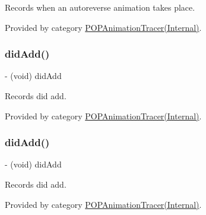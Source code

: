 Records when an autoreverse animation takes place. 

Provided by category \mbox{\hyperlink{category_p_o_p_animation_tracer_07_internal_08_a641c94b868612f3d5b92b24cc4098517}{P\+O\+P\+Animation\+Tracer(\+Internal)}}.

\mbox{\label{interface_p_o_p_animation_tracer_ad853415c050d51eea5ca62c154e9e94a}} 
\subsubsection{\texorpdfstring{did\+Add()}{didAdd()}\hspace{0.1cm}{\footnotesize\ttfamily [1/2]}}
{\footnotesize\ttfamily -\/ (void) did\+Add \begin{DoxyParamCaption}{ }\end{DoxyParamCaption}}

Records did add. 

Provided by category \mbox{\hyperlink{category_p_o_p_animation_tracer_07_internal_08_ad853415c050d51eea5ca62c154e9e94a}{P\+O\+P\+Animation\+Tracer(\+Internal)}}.

\mbox{\label{interface_p_o_p_animation_tracer_ad853415c050d51eea5ca62c154e9e94a}} 
\subsubsection{\texorpdfstring{did\+Add()}{didAdd()}\hspace{0.1cm}{\footnotesize\ttfamily [2/2]}}
{\footnotesize\ttfamily -\/ (void) did\+Add \begin{DoxyParamCaption}{ }\end{DoxyParamCaption}}

Records did add. 

Provided by category \mbox{\hyperlink{category_p_o_p_animation_tracer_07_internal_08_ad853415c050d51eea5ca62c154e9e94a}{P\+O\+P\+Animation\+Tracer(\+Internal)}}.

\mbox{\label{interface_p_o_p_animation_tracer_a03287c5af7d17de6143c7dcc0ac56251}} 
